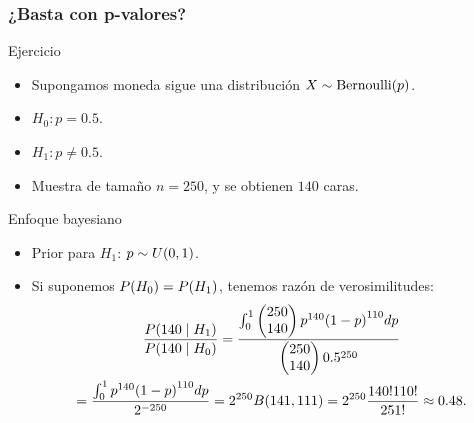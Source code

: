 \documentclass[table]{beamer}
\begin{document}
\begin{frame}
    \frametitle{¿Basta con p-valores?}
    \begin{block}{Ejercicio}
        \begin{itemize}
            \item Supongamos moneda sigue una distribución $X \sim \bernoulli{p}$.
            \item $H_{0}: p = 0.5$.
            \item $H_{1}: p \neq 0.5$.
            \item Muestra de tamaño $n = 250$, y se obtienen $140$ caras.
        \end{itemize}
    \end{block}
    \begin{block}{Enfoque bayesiano}
        \begin{itemize}
            \item Prior para $H_{1}$: $p \sim \uniform{0}{1}$.
            \item Si suponemos $\prob{H_{0}} = \prob{H_{1}}$, tenemos razón de verosimilitudes:
                \begin{multline*}
                    \frac{\prob{140 \mid H_{1}}}{\prob{140 \mid H_{0}}} = \frac{\int_{0}^{1} \combin{250}{140} p^{140} \parens{1 - p}^{110} d p}{\combin{250}{140} 0.5^{250}}
                    \\
                    = \frac{\int_{0}^{1} p^{140} \parens{1 - p}^{110} d p}{2^{- 250}}
                    = 2^{250} \betafunc{141}{111}
                    = 2^{250} \frac{140 ! 110 !}{251 !}
                    \approx 0.48
                    .
                \end{multline*}
        \end{itemize}
    \end{block}
\end{frame}
\end{document}
